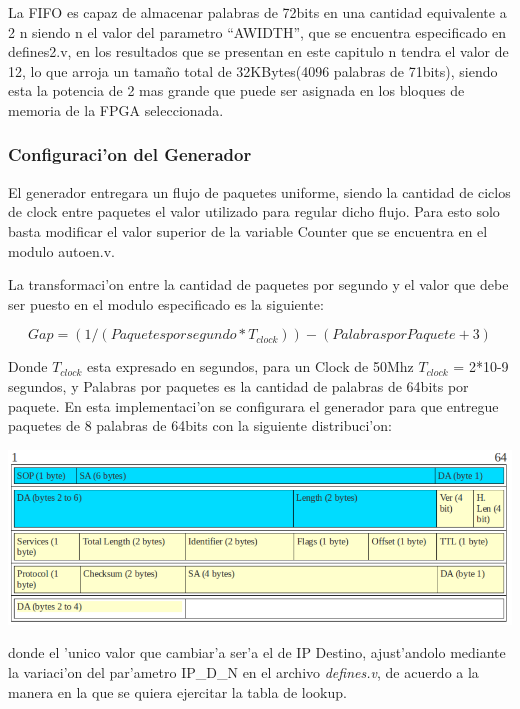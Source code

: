 \documentclass[12pt,spanish]{article}
\begin{document}
La FIFO es capaz de almacenar palabras de 72bits en una cantidad equivalente a 2 n  siendo n  el valor del parametro “AWIDTH”, que se encuentra especificado en defines2.v,  en los resultados que se presentan en este capitulo n tendra el valor de 12, lo que arroja un tama\~no total de 32KBytes(4096 palabras de 71bits), siendo esta la potencia de 2 mas grande que puede ser asignada en los bloques de memoria de la FPGA seleccionada.

\subsubsection*{Configuraci'on del Generador}

El generador entregara un flujo de paquetes uniforme, siendo la cantidad de ciclos de clock entre paquetes el valor utilizado para regular dicho flujo. Para esto solo basta modificar el valor superior de la variable Counter que se encuentra en el modulo autoen.v.

La transformaci'on entre la cantidad de paquetes por segundo y el valor que debe ser puesto en el modulo especificado es la siguiente:

\[  Gap=(1/(Paquetes por segundo * T_{clock})) - ( Palabras por Paquete + 3) \] 

Donde $T_{clock}$ esta expresado en segundos, para un Clock de 50Mhz $T_{clock}$   = 2*10-9  segundos, y Palabras por paquetes es la cantidad de palabras de 64bits por paquete. En esta implementaci'on se configurara el generador para que entregue paquetes de 8 palabras de 64bits con la siguiente distribuci'on: 

\begin{center}
	\includegraphics[width=1\textwidth]{graf/frame.png}
\end{center}

donde el 'unico valor que cambiar'a ser'a el de IP Destino, ajust'andolo mediante la variaci'on del par'ametro IP\_D\_N en el archivo \textit{defines.v}, de acuerdo a la manera en la que se quiera ejercitar la tabla de lookup.
\end{document}

